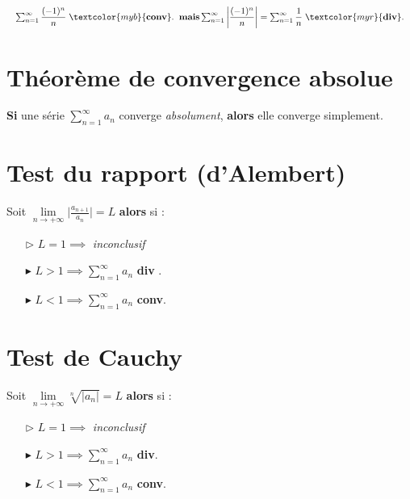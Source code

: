 \documentclass{report}
\begin{document}
\begin{multicols*}{3}
    \noindent 
    \begin{align*}
    \resizebox{1\linewidth}{!}{$
    \sum_{n=1}^{\infty }\dfrac{(-1)^n}{n} \; 
    \textcolor{myb}{\textbf{conv}}. \;\;  \textbf{mais} 
          \sum_{n=1}^{\infty }\left|\dfrac{(-1)^n}{n} \right| = 
          \sum_{n=1}^{\infty }\dfrac{1}{n} \;
          \textcolor{myr}{\textbf{div}}.  
    $}          
    \end{align*}
    \section{Théorème de convergence absolue}
    \textbf{Si} une série $\sum_{n=1}^{\infty }a_n$ converge \textit{absolument}, 
       \textbf{alors} elle converge simplement.  


    \section{Test du rapport (d'Alembert)}
    Soit $\lim\limits_{n \to+\infty } \Big|\frac{a_{n+1}}{a_n}  \Big| = L$ 
    \textbf{alors} si :   
    \begin{itemize}
    \item [$\rhd$ ] $L = 1 \implies$ \textit{ inconclusif}  
    \item [$\blacktriangleright$ ] $L > 1 \implies \sum_{n=1}^{\infty } a_n$ 
      \textcolor{myr}{\textbf{div}} .   
    \item [$\blacktriangleright$ ] $L < 1 \implies \sum_{n=1}^{\infty } a_n$ 
    \textcolor{myb}{\textbf{conv}}. 
    \end{itemize}


    \section{Test de Cauchy}
    \mbox{}\vspace{0.2em}
    Soit $\lim\limits_{n \to+\infty } \sqrt[n]{\big| a_n \big|} = L$ 
    \textbf{alors} si :   
    \begin{itemize}
    \item [$\rhd$ ] $L = 1 \implies$ \textit{inconclusif}  
    \item [$\blacktriangleright$ ] $L > 1 \implies \sum_{n=1}^{\infty }a_n$ 
        \textcolor{myr}{\textbf{div}}. 
    \item [$\blacktriangleright$ ] $L < 1 \implies \sum_{n=1}^{\infty }a_n$ 
        \textcolor{myb}{\textbf{conv}}. 
    \end{itemize}



\end{multicols*}
\end{document}
